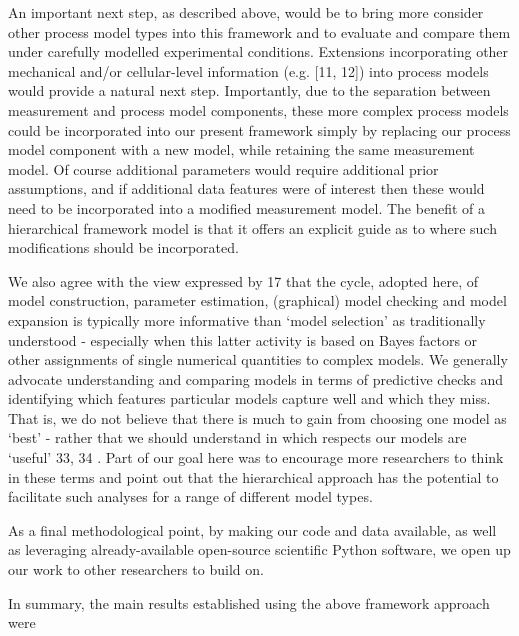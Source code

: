 \documentclass[10pt,letterpaper]{article}
\providecommand{\DIFaddtex}[1]{{\protect\color{blue} \sf #1}} %
\providecommand{\DIFdeltex}[1]{{\protect\color{red} \scriptsize #1}} %
\providecommand{\DIFaddbegin}{} %
\providecommand{\DIFaddend}{} %
\providecommand{\DIFdelbegin}{} %
\providecommand{\DIFdelend}{} %
\providecommand{\DIFadd}[1]{\texorpdfstring{\DIFaddtex{#1}}{#1}} %
\providecommand{\DIFdel}[1]{\texorpdfstring{\DIFdeltex{#1}}{}} %
\begin{document}
An important next step, as described above, would be to \DIFdelbegin \DIFdel{bring more
}\DIFdelend \DIFaddbegin \DIFadd{consider other
}\DIFaddend process model types \DIFdelbegin \DIFdel{into this framework }\DIFdelend and to evaluate and compare them under carefully
modelled experimental conditions. Extensions incorporating other
mechanical and/or cellular-level information (e.g. {[}11, 12{]}) into
process models would provide a natural next step. Importantly, due to
the separation between measurement and process model components, these
more complex process models could be incorporated into our present
framework simply by replacing our process model component with a new
model, while retaining the same measurement model. Of course additional
parameters would require additional prior assumptions, and if additional
data features were of interest then these would need to be incorporated
into a modified measurement model. The benefit of a hierarchical \DIFdelbegin \DIFdel{framework }\DIFdelend \DIFaddbegin \DIFadd{model
}\DIFaddend is that it offers an explicit guide as to where such modifications
should be incorporated.

\DIFdelbegin \DIFdel{We also agree with the view expressed by }%
\DIFdel{17}%
\DIFdel{that the cycle,
adopted here, of model construction, parameter estimation, (graphical)
model checking and model expansion is typically more informative than
`model selection' as traditionally understood - especially when this
latter activity is based on Bayes factors or other assignments of single
numerical quantities to complex models. We generally advocate
understanding and comparing models in terms of predictive checks and
identifying which features particular models capture well and which they
miss. That is, we do not believe that there is much to gain from
choosing one model as `best' - rather that we should understand in which
respects our models are `useful' }%
\DIFdel{33, 34}%
\DIFdel{. Part of our goal here was
to encourage more researchers to think in these terms and point out that
the hierarchical approach has the potential to facilitate such analyses
for a range of different model types.
}%

\DIFdel{As a final methodological point, by making our code and data available,
as well as leveraging already-available open-source scientific Python
software, we open up our work to other researchers to build on.
}%

\DIFdelend In summary, the main results established using the above \DIFdelbegin \DIFdel{framework }\DIFdelend \DIFaddbegin \DIFadd{approach }\DIFaddend were
\end{document}
